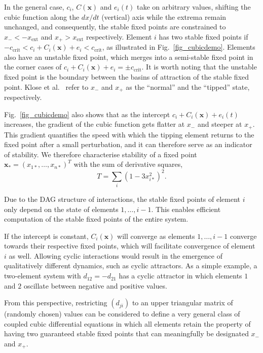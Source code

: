 \documentclass[conference]{IEEEtran}
\newcommand{\vectorsym}[1]{\ensuremath{\mathbf{#1}}}
\newcommand{\xextremum}{\ensuremath{x_{\mathrm{ext}}}}
\newcommand{\ccrit}{\ensuremath{c_{\mathrm{crit}}}}
\newcommand{\agentimpact}{\ensuremath{e}}
\newcommand{\couplingconstant}{\ensuremath{d}}
\newcommand{\couplingfunction}{\ensuremath{C}}
\newcommand{\sumderivsquares}{\ensuremath{T}}
\begin{document}
In the general case, $c_i$, $C(\vectorsym{x})$ and $\agentimpact_i(t)$
take on arbitrary values, shifting the cubic function along the
$dx / dt$ (vertical) axis while the extrema remain unchanged, and consequently,
the stable fixed points are constrained to $x_{-} < -\xextremum$ and
$x_{+} > \xextremum$ respectively. Element $i$ has two stable fixed
points if
$-\ccrit < c_i + \couplingfunction_i(\vectorsym{x}) + \agentimpact_i <
\ccrit$,
as illustrated in Fig.~\ref{fig_cubicdemo}. Elements also have an
unstable fixed point, which merges into a semi-stable fixed point in
the corner cases of
$c_i + \couplingfunction_i(\vectorsym{x}) + \agentimpact_i = \pm
\ccrit$.
It is worth noting that the unstable fixed point is the boundary
between the basins of attraction of the stable fixed point. Klose et
al.\ \cite{Klose2019_interactingtippingelements} refer to $x_{-}$ and
$x_{+}$ as the ``normal'' and the ``tipped'' state, respectively.

Fig.~\ref{fig_cubicdemo} also shows that as the intercept
$c_i + \couplingfunction_i(\vectorsym{x}) + \agentimpact_i(t)$
increases, the gradient of the cubic function gets flatter at $x_{-}$
and steeper at $x_{+}$. This gradient quantifies the speed with which
the tipping element returns to the fixed point after a small
perturbation, and it can therefore serve as an indicator of stability.
We therefore characterise stability of a fixed point
$\vectorsym{x}_* = (x_{1*}, \ldots, x_{n*})^T$ with the sum of
derivative squares,
\begin{equation}
  \label{eq_dss}
  \sumderivsquares = \sum_i (1 - 3 x_{i*}^2)^2.
\end{equation}

Due to the DAG structure of interactions, the stable fixed points of
element $i$ only depend on the state of elements $1, \ldots, i - 1$.
This enables efficient computation of the stable fixed points of the
entire system.

If the intercept is constant, $\couplingfunction_i(\vectorsym{x})$
will converge as elements $1, \ldots, i - 1$ converge towards their
respective fixed points, which will facilitate convergence of element
$i$ as well. Allowing cyclic interactions would result in the
emergence of qualitatively different dynamics, such as cyclic
attractors. As a simple example, a two-element system with
$\couplingconstant_{12} = -\couplingconstant_{21}$ has a cyclic
attractor in which elements $1$ and $2$ oscillate between negative and
positive values.

From this perspective, restricting $(\couplingconstant_{ji})$ to an upper triangular
matrix of (randomly chosen) values can be considered to define a very
general class of coupled cubic differential equations in which all
elements retain the property of having two guaranteed stable fixed
points that can meaningfully be designated $x_{-}$ and $x_{+}$.
\end{document}
